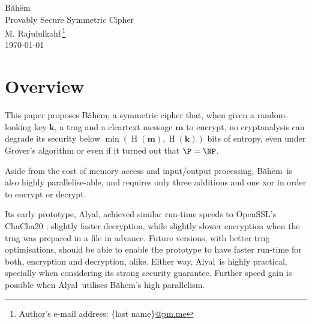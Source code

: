 \documentclass[twocolumn,hidelinks]{article}
\newcommand{\baheem}{Băhēm}
\newcommand{\alyal}{Alyal}
\DeclareMathOperator{\entropy}{H}
\begin{document}
\begin{center}
    \Huge
    \baheem\\
    \Large
    Provably Secure Symmetric Cipher\\
    \normalsize
    \vspace{0.5em}
    M. Rajululkahf\,\footnote{Author's e-mail address: \{last
    name\}\url{@pm.me}}\\
    \vspace{0.5em}
    \footnotesize
    \today\\
\end{center}

\section*{Overview}
This paper proposes \baheem;  a symmetric cipher that, when given a
random-looking key $\mathbf{k}$, a \gls{trng} and a cleartext message
$\mathbf{m}$ to encrypt, no cryptanalysis can degrade its security below
$\min(\entropy(\mathbf{m}), \entropy(\mathbf{k}))$ bits of entropy, even
under Grover's algorithm \cite{10.1145/237814.237866} or even if it turned
out that $\P = \NP$.

Aside from the cost of memory access and input/output processing, \baheem\
is also highly parallelise-able, and requires only three additions and one
\gls{xor} in order to encrypt or decrypt.

Its early prototype, \alyal, achieved similar run-time speeds to OpenSSL's
ChaCha20 \cite{chacha20}; slightly faster decryption, while slightly slower
encryption when the \gls{trng} was prepared in a file in advance.  Future
versions, with better \gls{trng} optimisations, should be able to enable
the prototype to have faster run-time for both, encryption and decryption,
alike.  Either way, \alyal\ is highly practical, specially when considering
its strong security guarantee.  Further speed gain is possible when \alyal\
utilises \baheem's high parallelism.
\end{document}

